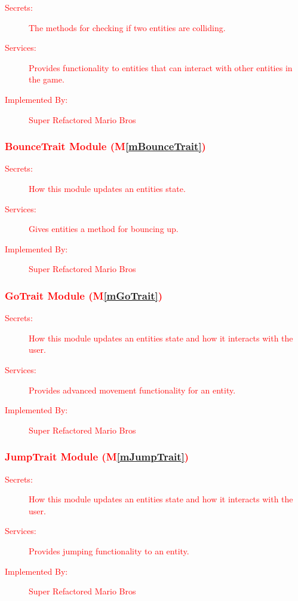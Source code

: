 \documentclass[12pt, titlepage]{article}
\newcommand{\mref}[1]{M\ref{#1}}
\begin{document}
\begin{description}
\item[\textcolor{red}{Secrets:}] \textcolor{red}{The methods for checking if two entities are colliding.}
\item[\textcolor{red}{Services:}] \textcolor{red}{Provides functionality to entities that can interact with other entities in the game.}
\item[\textcolor{red}{Implemented By:}] \textcolor{red}{Super Refactored Mario Bros}
\end{description}

\subsubsection{\textcolor{red}{BounceTrait Module (\mref{mBounceTrait})}}

\begin{description}
\item[\textcolor{red}{Secrets:}] \textcolor{red}{How this module updates an entities state.}
\item[\textcolor{red}{Services:}] \textcolor{red}{Gives entities a method for bouncing up.}
\item[\textcolor{red}{Implemented By:}] \textcolor{red}{Super Refactored Mario Bros}
\end{description}

\subsubsection{\textcolor{red}{GoTrait Module (\mref{mGoTrait})}}

\begin{description}
\item[\textcolor{red}{Secrets:}] \textcolor{red}{How this module updates an entities state and how it interacts with the user.}
\item[\textcolor{red}{Services:}] \textcolor{red}{Provides advanced movement functionality for an entity.}
\item[\textcolor{red}{Implemented By:}] \textcolor{red}{Super Refactored Mario Bros}
\end{description}

\subsubsection{\textcolor{red}{JumpTrait Module (\mref{mJumpTrait})}}

\begin{description}
\item[\textcolor{red}{Secrets:}] \textcolor{red}{How this module updates an entities state and how it interacts with the user.}
\item[\textcolor{red}{Services:}] \textcolor{red}{Provides jumping functionality to an entity.}
\item[\textcolor{red}{Implemented By:}] \textcolor{red}{Super Refactored Mario Bros}
\end{description}
\end{document}
